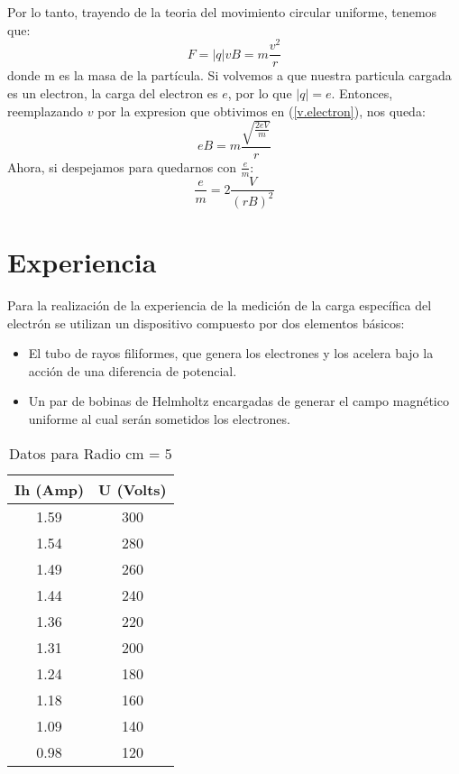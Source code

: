 \documentclass[a4paper,12pt]{report}
\begin{document}
    Por lo tanto, trayendo de la teoria del movimiento circular uniforme, tenemos que:
    \begin{equation*}
        F = |q| v B = m \frac{v^2}{r}
    \end{equation*}
    donde m es la masa de la partícula. 
    Si volvemos a que nuestra particula cargada es un electron, la carga del electron es $e$, por lo que $|q| = e$.
    Entonces, reemplazando $v$ por la expresion que obtivimos en (\ref{v.electron}), nos queda:
    \begin{equation*}
        e B = m \frac{\sqrt{\frac{2 eV}{m}}}{r}
    \end{equation*}
    Ahora, si despejamos para quedarnos con $\frac{e}{m}$:
    \begin{equation}
        \label{relac.e/m}
        \frac{e}{m} = 2 \frac{V}{(r B)^2}
    \end{equation}

\chapter{Experiencia}
    Para la realización de la experiencia de la medición de la carga específica del electrón se utilizan un dispositivo
    compuesto por dos elementos básicos:
    \begin{itemize}
        \item El tubo de rayos filiformes, que genera los electrones y los acelera bajo la acción de una diferencia de
            potencial.
        \item Un par de bobinas de Helmholtz encargadas de generar el campo magnético uniforme al cual serán sometidos
            los electrones.
    \end{itemize}

    \begin{table}[h]
        \centering
        \begin{tabular}{|c|c|}
            \hline
            \textbf{Ih (Amp)} & \textbf{U (Volts)} \\ \hline
            1.59 & 300 \\ \hline
            1.54 & 280 \\ \hline
            1.49 & 260 \\ \hline
            1.44 & 240 \\ \hline
            1.36 & 220 \\ \hline
            1.31 & 200 \\ \hline
            1.24 & 180 \\ \hline
            1.18 & 160 \\ \hline
            1.09 & 140 \\ \hline
            0.98 & 120 \\ \hline
        \end{tabular}
        \caption{Datos para Radio cm = 5}
    \end{table}
    
\end{document}
